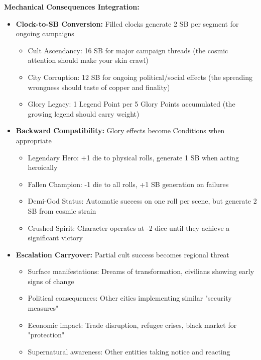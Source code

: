 \documentclass[11pt]{article}
\begin{document}
\begin{itemize}
\textbf{Mechanical Consequences Integration:}
\begin{itemize}
\item \textbf{Clock-to-SB Conversion:} Filled clocks generate 2 SB per segment for ongoing campaigns
  \begin{itemize}
  \item Cult Ascendancy: 16 SB for major campaign threads (the cosmic attention should make your skin crawl)
  \item City Corruption: 12 SB for ongoing political/social effects (the spreading wrongness should taste of copper and finality)
  \item Glory Legacy: 1 Legend Point per 5 Glory Points accumulated (the growing legend should carry weight)
  \end{itemize}
\item \textbf{Backward Compatibility:} Glory effects become Conditions when appropriate
  \begin{itemize}
  \item Legendary Hero: +1 die to physical rolls, generate 1 SB when acting heroically
  \item Fallen Champion: -1 die to all rolls, +1 SB generation on failures
  \item Demi-God Status: Automatic success on one roll per scene, but generate 2 SB from cosmic strain
  \item Crushed Spirit: Character operates at -2 dice until they achieve a significant victory
  \end{itemize}
\item \textbf{Escalation Carryover:} Partial cult success becomes regional threat
  \begin{itemize}
  \item Surface manifestations: Dreams of transformation, civilians showing early signs of change
  \item Political consequences: Other cities implementing similar "security measures"
  \item Economic impact: Trade disruption, refugee crises, black market for "protection"
  \item Supernatural awareness: Other entities taking notice and reacting
  \end{itemize}
\end{itemize}


\end{itemize}
\end{document}
